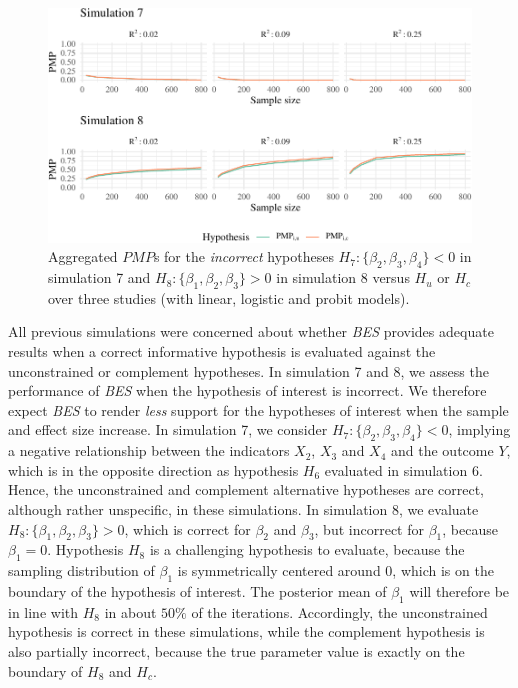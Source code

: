 \documentclass[review, 3p, authoryear]{elsarticle} %
\begin{document}
\begin{figure}
\includegraphics[width=1\linewidth]{manuscript_volker_files/figure-latex/PMP78-1} \caption{Aggregated $PMP$s for the \textit{incorrect} hypotheses $H_7: \{\beta_2, \beta_3, \beta_4\} < 0$ in simulation 7 and $H_8: \{\beta_1, \beta_2, \beta_3\} > 0$ in simulation 8 versus $H_u$ or $H_c$ over three studies (with linear, logistic and probit models).}\label{fig:PMP78}
\end{figure}

All previous simulations were concerned about whether \emph{BES} provides adequate results when a correct informative hypothesis is evaluated against the unconstrained or complement hypotheses.
In simulation 7 and 8, we assess the performance of \emph{BES} when the hypothesis of interest is incorrect.
We therefore expect \emph{BES} to render \emph{less} support for the hypotheses of interest when the sample and effect size increase.
In simulation 7, we consider \(H_7: \{\beta_2, \beta_3, \beta_4\} < 0\), implying a negative relationship between the indicators \(X_2\), \(X_3\) and \(X_4\) and the outcome \(Y\), which is in the opposite direction as hypothesis \(H_6\) evaluated in simulation 6.
Hence, the unconstrained and complement alternative hypotheses are correct, although rather unspecific, in these simulations.
In simulation 8, we evaluate \(H_8: \{\beta_1, \beta_2, \beta_3\} > 0\), which is correct for \(\beta_2\) and \(\beta_3\), but incorrect for \(\beta_1\), because \(\beta_1 = 0\).
Hypothesis \(H_8\) is a challenging hypothesis to evaluate, because the sampling distribution of \(\beta_1\) is symmetrically centered around 0, which is on the boundary of the hypothesis of interest.
The posterior mean of \(\beta_1\) will therefore be in line with \(H_8\) in about \(50\%\) of the iterations.
Accordingly, the unconstrained hypothesis is correct in these simulations, while the complement hypothesis is also partially incorrect, because the true parameter value is exactly on the boundary of \(H_8\) and \(H_c\).
\end{document}
